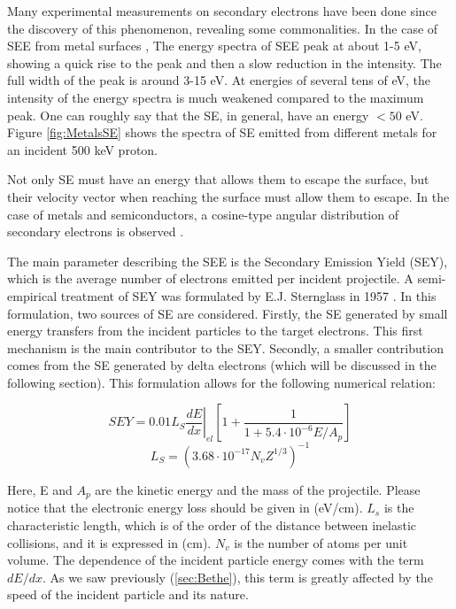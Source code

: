Many experimental measurements on secondary electrons have been done since the discovery of this phenomenon, revealing some commonalities. In the case of SEE from metal surfaces \parencite*[][]{ref:see3},  The energy spectra of SEE peak at about 1-5 eV, showing a quick rise to the peak and then a slow reduction in the intensity. The full width of the peak is around 3-15 \si[]{\electronvolt}. At energies of several tens of \si[]{\electronvolt}, the intensity of the energy spectra is much weakened compared to the maximum peak. One can roughly say that the SE, in general, have an energy $< 50$ \si[]{\electronvolt}. Figure \ref{fig:MetalsSE} shows the spectra of SE emitted from different metals for an incident 500 \si[]{\kilo\electronvolt} proton. 

Not only SE must have an energy that allows them to escape the surface, but their velocity vector when reaching the surface must allow them to escape. In the case of metals and semiconductors, a cosine-type angular distribution of secondary electrons is observed \parencite[][]{ref:angleSemi}. 

The main parameter describing the SEE is the Secondary Emission Yield (SEY), which is the average number of electrons emitted per incident projectile. A semi-empirical treatment of SEY was formulated by E.J. Sternglass in 1957 \parencite*[][]{ref:SEY}. In this formulation, two sources of SE are considered. Firstly, the SE generated by small energy transfers from the incident particles to the target electrons. This first mechanism is the main contributor to the SEY. Secondly, a smaller contribution comes from the SE generated by delta electrons (which will be discussed in the following section). This formulation allows for the following numerical relation: 

\begin{equation}
    SEY = 0.01 L_S \left. \frac{dE}{dx}\right|_{el} \left[ 1+\frac{1}{1+5.4\cdot 10^{-6} E/A_p}\right]
    \label{eq:sey}
\end{equation}
\begin{equation}
    L_S = \left( 3.68\cdot 10^{-17} N_v Z^{1/3} \right)^{-1}
    \label{eq:LS}
\end{equation}

Here, E and $A_p$ are the kinetic energy and the mass of the projectile. Please notice that the electronic energy loss should be given in (\si[]{\electronvolt/\centi\metre}). $L_{s}$ is the characteristic length, which is of the order of the distance between inelastic collisions, and it is expressed in (\si[]{\centi\metre}). $N_v$ is the number of atoms per unit volume. The dependence of the incident particle energy comes with the term $dE/dx$. As we saw previously (\ref{sec:Bethe}), this term is greatly affected by the speed of the incident particle and its nature. 

